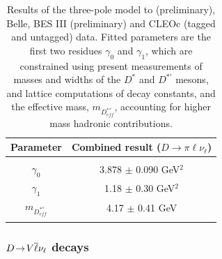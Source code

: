 \begin{table}[htbp]
\caption{Results of the three-pole model to \babar (preliminary), Belle, BES III (preliminary) and CLEOc (tagged and untagged) data. 
Fitted parameters are the first two residues 
$\gamma_0$  and $\gamma_{1}$, which are constrained using present measurements 
of masses and widths of the $D^\ast$ and $D^{\ast '}$ mesons, and lattice computations of decay constants, and the effective mass,  
$m_{D^{\ast ''}_{eff}}$, 
accounting for higher mass hadronic contributions. 
\label{3Pole_pi}}
\begin{center}
\begin{tabular}{cc}
\hline 
Parameter & Combined result ($D \to \pi \ell \nu_\ell $) \\ 
\hline 
\vspace*{-10pt} & \\
\hline
$\gamma_0$  & 3.878 $\pm$ 0.090  GeV$^2$ \\
$\gamma_1$  & 1.18 $\pm$ 0.30  GeV$^2$  \\
$m_{D^{\ast ''}_{eff}}$  & 4.17 $\pm$ 0.41 GeV \\
\hline
\vspace*{-10pt} & \\
\hline
\end{tabular}
\end{center}
\end{table}

\subsubsection{$D\!\rightarrow\! V\overline \ell \nu_\ell$ decays}


